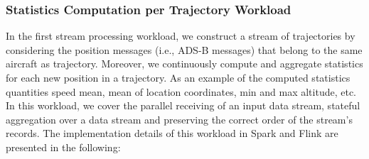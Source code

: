 \documentclass[]{article}
\begin{document}
\subsubsection{Statistics Computation per Trajectory Workload}
\label{sec:statistics}
In the first stream processing workload, we construct a stream of trajectories by considering  the position messages (i.e., ADS-B messages) that belong to the same aircraft as trajectory. Moreover, we continuously compute and aggregate statistics for each new position in a trajectory. As an example of the computed statistics quantities speed mean, mean of location coordinates, min and max altitude, etc. In this workload, we cover the parallel receiving of an input data stream, stateful aggregation over a data stream and preserving the correct order of the stream's records.
The implementation details of this workload in Spark and Flink are presented in the following: 
\end{document}
